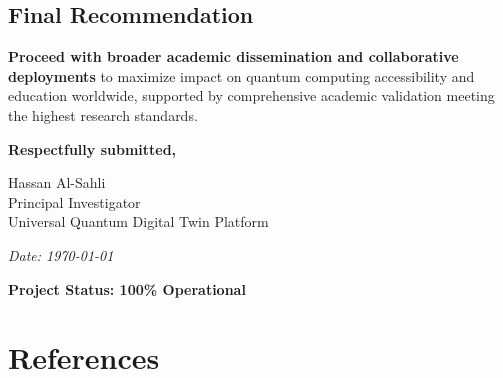 \documentclass[12pt,a4paper]{article}
\begin{document}
\subsection{Final Recommendation}

    \textbf{Proceed with broader academic dissemination and collaborative deployments} to maximize impact on quantum computing accessibility and education worldwide, supported by comprehensive academic validation meeting the highest research standards.

\vspace{1cm}

\textbf{Respectfully submitted,}

\vspace{0.5cm}

Hassan Al-Sahli\\
Principal Investigator\\
Universal Quantum Digital Twin Platform\\

\vspace{0.5cm}

\textit{Date: \today}

\vspace{0.5cm}

\textcolor{quantumblue}{\textbf{Project Status: 100\% Operational}}

\newpage
\section{References}

\renewcommand{\refname}{} %
\end{document}
